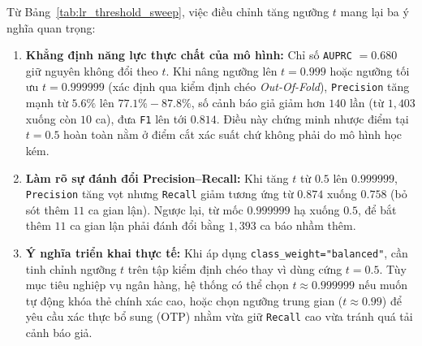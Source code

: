 Từ Bảng~\ref{tab:lr_threshold_sweep}, việc điều chỉnh tăng ngưỡng $t$ mang lại ba ý nghĩa quan trọng:
\begin{enumerate}
    \item \textbf{Khẳng định năng lực thực chất của mô hình:} Chỉ số \texttt{AUPRC} $= 0.680$ giữ nguyên không đổi theo $t$. Khi nâng ngưỡng lên $t = 0.999$ hoặc ngưỡng tối ưu $t = 0.999999$ (xác định qua kiểm định chéo \textit{Out-Of-Fold}), \texttt{Precision} tăng mạnh từ $5.6\%$ lên $77.1\% - 87.8\%$, số cảnh báo giả giảm hơn $140$ lần (từ $1{,}403$ xuống còn $10$ ca), đưa \texttt{F1} lên tới $0.814$. Điều này chứng minh nhược điểm tại $t = 0.5$ hoàn toàn nằm ở điểm cắt xác suất chứ không phải do mô hình học kém.
    \item \textbf{Làm rõ sự đánh đổi Precision--Recall:} Khi tăng $t$ từ $0.5$ lên $0.999999$, \texttt{Precision} tăng vọt nhưng \texttt{Recall} giảm tương ứng từ $0.874$ xuống $0.758$ (bỏ sót thêm $11$ ca gian lận). Ngược lại, từ mốc $0.999999$ hạ xuống $0.5$, để bắt thêm $11$ ca gian lận phải đánh đổi bằng $1{,}393$ ca báo nhầm thêm.
    \item \textbf{Ý nghĩa triển khai thực tế:} Khi áp dụng \texttt{class\_weight="balanced"}, cần tinh chỉnh ngưỡng $t$ trên tập kiểm định chéo thay vì dùng cứng $t = 0.5$. Tùy mục tiêu nghiệp vụ ngân hàng, hệ thống có thể chọn $t \approx 0.999999$ nếu muốn tự động khóa thẻ chính xác cao, hoặc chọn ngưỡng trung gian ($t \approx 0.99$) để yêu cầu xác thực bổ sung (OTP) nhằm vừa giữ \texttt{Recall} cao vừa tránh quá tải cảnh báo giả.
\end{enumerate}